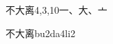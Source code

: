 \begin{entry}{不大离}{4,3,10}{⼀、⼤、⼇}
  \begin{phonetics}{不大离}{bu2da4li2}
  \end{phonetics}
\end{entry}
